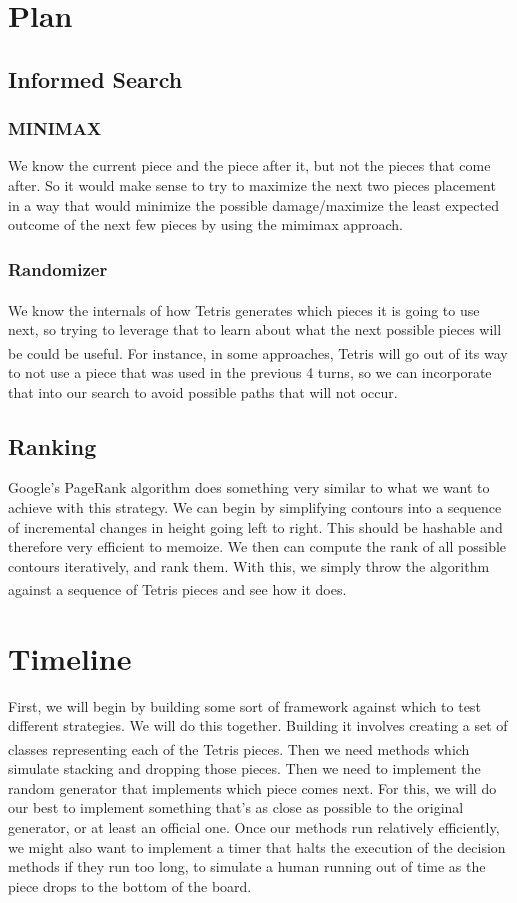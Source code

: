 \documentclass{article}
\def\tetris{Tetris\textsuperscript{\textregistered}}
\begin{document}
\section{Plan}

\subsection{Informed Search}
\subsubsection{MINIMAX} We know the current piece and the piece after it, but not the pieces that come after. So it would make sense to try to maximize the next two pieces placement in a way that would minimize the possible damage/maximize the least expected outcome of the next few pieces by using the mimimax approach.

\subsubsection{Randomizer} We know the internals of how \tetris{} generates which pieces it is going to use next, so trying to leverage that to learn about what the next possible pieces will be could be useful. For instance, in some approaches, \tetris{} will go out of its way to not use a piece that was used in the previous 4 turns, so we can incorporate that into our search to avoid possible paths that will not occur.

\subsection{Ranking}
Google's PageRank algorithm does something very similar to what we want to achieve with this strategy. We can begin by simplifying contours into a sequence of incremental changes in height going left to right. This should be hashable and therefore very efficient to memoize. We then can compute the rank of all possible contours iteratively, and rank them. With this, we simply throw the algorithm against a sequence of \tetris{} pieces and see how it does.


\section{Timeline}

\par First, we will begin by building some sort of framework against which to test different strategies. We will do this together. Building it involves creating a set of classes representing each of the \tetris{} pieces. Then we need methods which simulate stacking and dropping those pieces. Then we need to implement the random generator that implements which piece comes next. For this, we will do our best to implement something that's as close as possible to the original generator, or at least an official one. Once our methods run relatively efficiently, we might also want to implement a timer that halts the execution of the decision methods if they run too long, to simulate a human running out of time as the piece drops to the bottom of the board.
\end{document}

